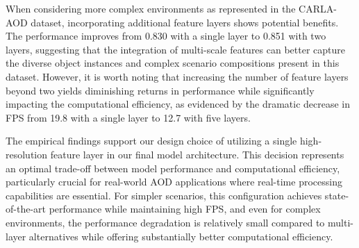 \documentclass[lettersize,journal]{IEEEtran}
\begin{document}
When considering more complex environments as represented in the CARLA-AOD dataset, incorporating additional feature layers shows potential benefits.   The performance improves from 0.830 with a single layer to 0.851 with two layers, suggesting that the integration of multi-scale features can better capture the diverse object instances and complex scenario compositions present in this dataset.   However, it is worth noting that increasing the number of feature layers beyond two yields diminishing returns in performance while significantly impacting the computational efficiency, as evidenced by the dramatic decrease in FPS from 19.8 with a single layer to 12.7 with five layers.

\begin{table}[!]
  \centering
  \caption{mAP Performance of Ablation Experiment on the Number of Feature Layers.}
  \label{layers ablation}%
\end{table}%



The empirical findings support our design choice of utilizing a single high-resolution feature layer in our final model architecture.   This decision represents an optimal trade-off between model performance and computational efficiency, particularly crucial for real-world AOD applications where real-time processing capabilities are essential.   For simpler scenarios, this configuration achieves state-of-the-art performance while maintaining high FPS, and even for complex environments, the performance degradation is relatively small compared to multi-layer alternatives while offering substantially better computational efficiency.
\end{document}

